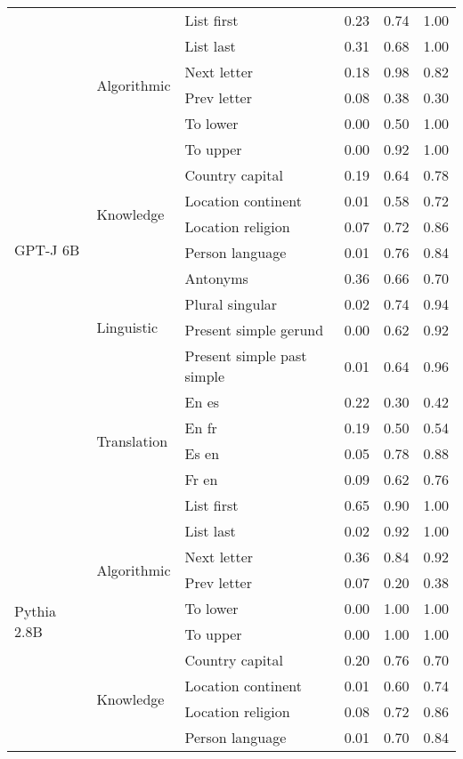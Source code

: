 \begin{center}
\begin{longtable}{lllrrr}
\multirow[t]{18}{*}{GPT-J 6B} & \multirow[t]{6}{*}{Algorithmic} & List first & 0.23 & 0.74 & 1.00 \\
 &  & List last & 0.31 & 0.68 & 1.00 \\
 &  & Next letter & 0.18 & 0.98 & 0.82 \\
 &  & Prev letter & 0.08 & 0.38 & 0.30 \\
 &  & To lower & 0.00 & 0.50 & 1.00 \\
 &  & To upper & 0.00 & 0.92 & 1.00 \\
\cline{2-6}
 & \multirow[t]{4}{*}{Knowledge} & Country capital & 0.19 & 0.64 & 0.78 \\
 &  & Location continent & 0.01 & 0.58 & 0.72 \\
 &  & Location religion & 0.07 & 0.72 & 0.86 \\
 &  & Person language & 0.01 & 0.76 & 0.84 \\
\cline{2-6}
 & \multirow[t]{4}{*}{Linguistic} & Antonyms & 0.36 & 0.66 & 0.70 \\
 &  & Plural singular & 0.02 & 0.74 & 0.94 \\
 &  & Present simple gerund & 0.00 & 0.62 & 0.92 \\
 &  & Present simple past simple & 0.01 & 0.64 & 0.96 \\
\cline{2-6}
 & \multirow[t]{4}{*}{Translation} & En es & 0.22 & 0.30 & 0.42 \\
 &  & En fr & 0.19 & 0.50 & 0.54 \\
 &  & Es en & 0.05 & 0.78 & 0.88 \\
 &  & Fr en & 0.09 & 0.62 & 0.76 \\
\cline{1-6} \cline{2-6}
\multirow[t]{18}{*}{Pythia 2.8B} & \multirow[t]{6}{*}{Algorithmic} & List first & 0.65 & 0.90 & 1.00 \\
 &  & List last & 0.02 & 0.92 & 1.00 \\
 &  & Next letter & 0.36 & 0.84 & 0.92 \\
 &  & Prev letter & 0.07 & 0.20 & 0.38 \\
 &  & To lower & 0.00 & 1.00 & 1.00 \\
 &  & To upper & 0.00 & 1.00 & 1.00 \\
\cline{2-6}
 & \multirow[t]{4}{*}{Knowledge} & Country capital & 0.20 & 0.76 & 0.70 \\
 &  & Location continent & 0.01 & 0.60 & 0.74 \\
 &  & Location religion & 0.08 & 0.72 & 0.86 \\
 &  & Person language & 0.01 & 0.70 & 0.84 \\

\end{longtable}
\end{center}
